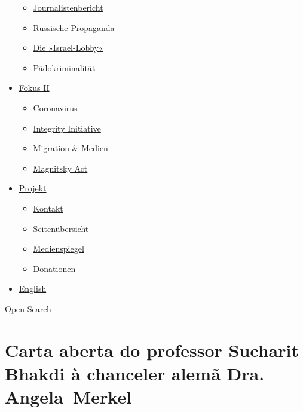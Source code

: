 \begin{itemize}
  \begin{itemize}
  \tightlist
  \item
    \href{https://swprs.org/bericht-eines-journalisten/}{Journalistenbericht}
  \item
    \href{https://swprs.org/russische-propaganda/}{Russische Propaganda}
  \item
    \href{https://swprs.org/die-israel-lobby-fakten-und-mythen/}{Die
    »Israel-Lobby«}
  \item
    \href{https://swprs.org/geopolitik-und-paedokriminalitaet/}{Pädokriminalität}
  \end{itemize}
\item
  \href{https://swprs.org/migration-und-medien/}{Fokus II}

  \begin{itemize}
  \tightlist
  \item
    \href{https://swprs.org/covid-19-hinweis-ii/}{Coronavirus}
  \item
    \href{https://swprs.org/die-integrity-initiative/}{Integrity
    Initiative}
  \item
    \href{https://swprs.org/migration-und-medien/}{Migration \& Medien}
  \item
    \href{https://swprs.org/der-fall-magnitsky/}{Magnitsky Act}
  \end{itemize}
\item
  \href{https://swprs.org/kontakt/}{Projekt}

  \begin{itemize}
  \tightlist
  \item
    \href{https://swprs.org/kontakt/}{Kontakt}
  \item
    \href{https://swprs.org/uebersicht/}{Seitenübersicht}
  \item
    \href{https://swprs.org/medienspiegel/}{Medienspiegel}
  \item
    \href{https://swprs.org/donationen/}{Donationen}
  \end{itemize}
\item
  \href{https://swprs.org/contact/}{English}
\end{itemize}

\protect\hyperlink{}{Open Search}

\hypertarget{carta-aberta-do-professor-sucharit-bhakdi-uxe0-chanceler-alemuxe3-dra-angela-merkel}{%
\section{Carta aberta do professor Sucharit Bhakdi à chanceler alemã
Dra.
Angela~Merkel}\label{carta-aberta-do-professor-sucharit-bhakdi-uxe0-chanceler-alemuxe3-dra-angela-merkel}}

